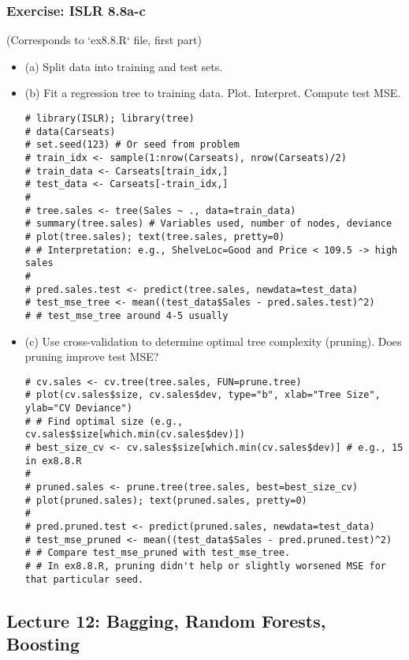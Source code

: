 \documentclass[12pt,a4paper]{article}
\begin{document}
\begin{itemize}
    \subsubsection{Exercise: ISLR 8.8a-c}
        (Corresponds to `ex8.8.R` file, first part)
        \begin{itemize}
            \item (a) Split data into training and test sets.
            \item (b) Fit a regression tree to training data. Plot. Interpret. Compute test MSE.
\begin{lstlisting}[caption={ISLR 8.8b - Basic Regression Tree}]
# library(ISLR); library(tree)
# data(Carseats)
# set.seed(123) # Or seed from problem
# train_idx <- sample(1:nrow(Carseats), nrow(Carseats)/2)
# train_data <- Carseats[train_idx,]
# test_data <- Carseats[-train_idx,]
# 
# tree.sales <- tree(Sales ~ ., data=train_data)
# summary(tree.sales) # Variables used, number of nodes, deviance
# plot(tree.sales); text(tree.sales, pretty=0)
# # Interpretation: e.g., ShelveLoc=Good and Price < 109.5 -> high sales
# 
# pred.sales.test <- predict(tree.sales, newdata=test_data)
# test_mse_tree <- mean((test_data$Sales - pred.sales.test)^2)
# # test_mse_tree around 4-5 usually
\end{lstlisting}
            \item (c) Use cross-validation to determine optimal tree complexity (pruning). Does pruning improve test MSE?
\begin{lstlisting}[caption={ISLR 8.8c - Pruning Regression Tree}]
# cv.sales <- cv.tree(tree.sales, FUN=prune.tree)
# plot(cv.sales$size, cv.sales$dev, type="b", xlab="Tree Size", ylab="CV Deviance")
# # Find optimal size (e.g., cv.sales$size[which.min(cv.sales$dev)])
# best_size_cv <- cv.sales$size[which.min(cv.sales$dev)] # e.g., 15 in ex8.8.R
# 
# pruned.sales <- prune.tree(tree.sales, best=best_size_cv)
# plot(pruned.sales); text(pruned.sales, pretty=0)
# 
# pred.pruned.test <- predict(pruned.sales, newdata=test_data)
# test_mse_pruned <- mean((test_data$Sales - pred.pruned.test)^2)
# # Compare test_mse_pruned with test_mse_tree.
# # In ex8.8.R, pruning didn't help or slightly worsened MSE for that particular seed.
\end{lstlisting}
        \end{itemize}


\subsection{Lecture 12: Bagging, Random Forests, Boosting }

\end{itemize}
\end{document}
